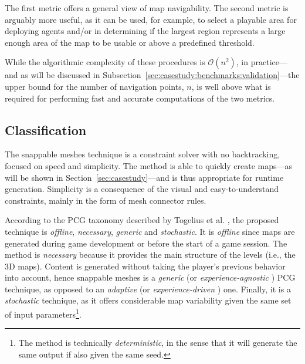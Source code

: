\documentclass[journal]{IEEEtran}
\begin{document}
The first metric offers a general view of map navigability. The second metric is
arguably more useful, as it can be used, for example, to select a playable area for
deploying agents and/or in determining if the largest region represents a large enough
area of the map to be usable or above a predefined threshold.

While the algorithmic complexity of these procedures is $\mathcal{O}(n^2)$, in practice---and
as will be discussed in Subsection~\ref{sec:casestudy:benchmarks:validation}---the upper bound
for the number of navigation points, $n$, is well above what is required for performing fast
and accurate computations of the two metrics.

\subsection{Classification}
\label{sec:methods:class}

The snappable meshes technique is a constraint solver with no backtracking, focused
on speed and simplicity. The method is able to quickly create maps---as will be shown
in Section~\ref{sec:casestudy}---and is thus appropriate for runtime generation.
Simplicity is a consequence of the visual and easy-to-understand constraints, mainly
in the form of mesh connector rules.

According to the PCG taxonomy described by Togelius et al. \cite{togelius2016intro},
the proposed technique is \emph{offline}, \emph{necessary}, \emph{generic} and
\emph{stochastic}. It is \emph{offline} since maps are generated during game
development or before the start of a game session. The method is \emph{necessary}
because it provides the main structure of the levels (i.e., the 3D maps). Content
is generated without taking the player's previous behavior into account,
hence snappable meshes is a \emph{generic} (or \textit{experience-agnostic}
\cite{yannakakis2018artificial}) PCG technique, as opposed to an \textit{adaptive}
(or \textit{experience-driven} \cite{yannakakis2018artificial}) one. Finally, it is
a \textit{stochastic} technique, as it offers considerable map variability given the
same set of input parameters\footnote{The method is technically \textit{deterministic},
in the sense that it will generate the same output if also given the same seed.}.
\end{document}
